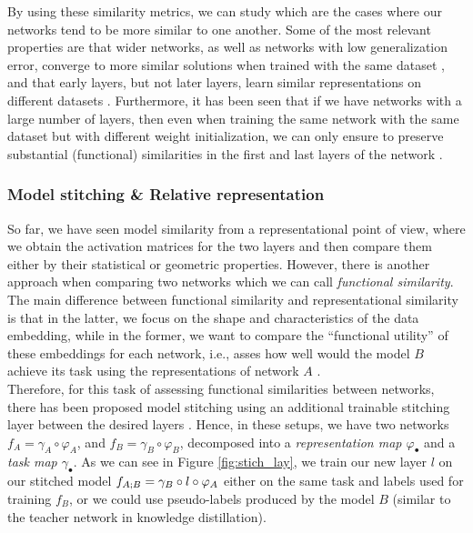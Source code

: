 \documentclass[../main.tex]{subfiles}
\begin{document}
By using these similarity metrics, we can study which are the cases where our networks tend to be more similar to one another. Some of the most relevant properties are that wider networks, as well as networks with low generalization error, converge to more similar solutions when trained with the same dataset \cite{morcos_insights_2018}, and that early layers, but not later layers, learn similar representations on different datasets \cite{barannikov_representation_2022}. Furthermore, it has been seen that if we have networks with a large number of layers, then even when training the same network with the same dataset but with different weight initialization, we can only ensure to preserve substantial (functional) similarities in the first and last layers of the network \cite{wang_towards_2018}.


\subsubsection*{Model stitching \& Relative representation}
So far, we have seen model similarity from a representational point of view, where we obtain the activation matrices for the two layers and then compare them either by their statistical or geometric properties. However, there is another approach when comparing two networks which we can call \emph{functional similarity}. The main difference between functional similarity and representational similarity is that in the latter, we focus on the shape and characteristics of the data embedding, while in the former, we want to compare the ``functional utility'' of these embeddings for each network, i.e., asses how well would the model $B$ achieve its task using the representations of network $A$ \cite{csiszarik_similarity_2021}.\\

Therefore, for this task of assessing functional similarities between networks, there has been proposed model stitching using an additional trainable stitching layer between the desired layers \cite{csiszarik_similarity_2021, bansal_revisiting_2021, li_convergent_2016}. Hence, in these setups, we have two networks $f_A=\gamma_A \circ \varphi_A$, and $f_B=\gamma_B \circ \varphi_B$, decomposed into a \emph{representation map $\varphi_\bullet$} and a \emph{task map $\gamma_\bullet$}. As we can see in Figure \ref{fig:stich_lay}, we train our new layer $l$ on our stitched model $f_{A \mathbin{;} B}=\gamma_B \circ l \circ \varphi_A$ either on the same task and labels used for training $f_B$, or we could use pseudo-labels produced by the model $B$ (similar to the teacher network in knowledge distillation). 
\end{document}
